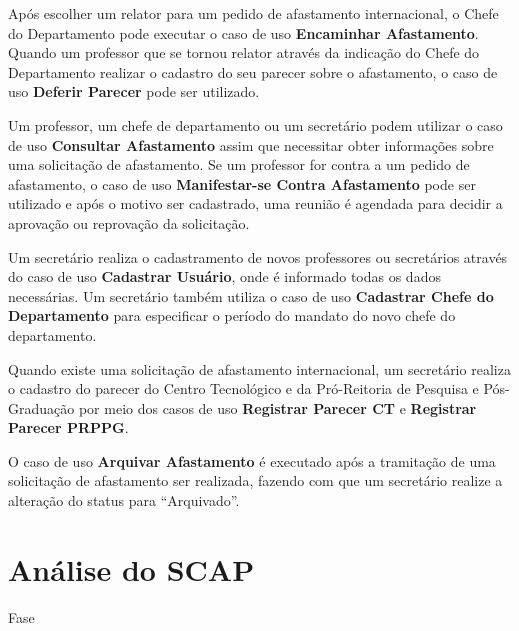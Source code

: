 Após escolher um relator para um pedido de afastamento internacional, o Chefe do Departamento pode executar o caso de uso \textbf{Encaminhar Afastamento}. Quando um professor que se tornou relator através da indicação do Chefe do Departamento realizar o cadastro do seu parecer sobre o afastamento, o caso de uso \textbf{Deferir Parecer} pode ser utilizado.

Um professor, um chefe de departamento ou um secretário podem utilizar o caso de uso \textbf{Consultar Afastamento} assim que necessitar obter informações sobre uma solicitação de afastamento. Se um professor for contra a um pedido de afastamento, o caso de uso \textbf{Manifestar-se Contra Afastamento} pode ser utilizado e após o motivo ser cadastrado, uma reunião é agendada para decidir a aprovação ou reprovação da solicitação.

Um secretário realiza o cadastramento de novos professores ou secretários através do caso de uso \textbf{Cadastrar Usuário}, onde é informado todas os dados necessárias. Um secretário também utiliza o caso de uso \textbf{Cadastrar Chefe do Departamento} para especificar o período do mandato do novo chefe do departamento.
  
Quando existe uma solicitação de afastamento internacional, um secretário realiza o cadastro do parecer do Centro Tecnológico e da Pró-Reitoria de Pesquisa e Pós-Graduação por meio dos casos de uso \textbf{Registrar Parecer CT} e \textbf{Registrar Parecer PRPPG}.

O caso de uso \textbf{Arquivar Afastamento} é executado após a tramitação de uma solicitação de afastamento ser realizada, fazendo com que um secretário realize a alteração do status para ``Arquivado''.   

\section{Análise do SCAP}
\label{sec-requisitos-analise-scap}

Fase





   
 
